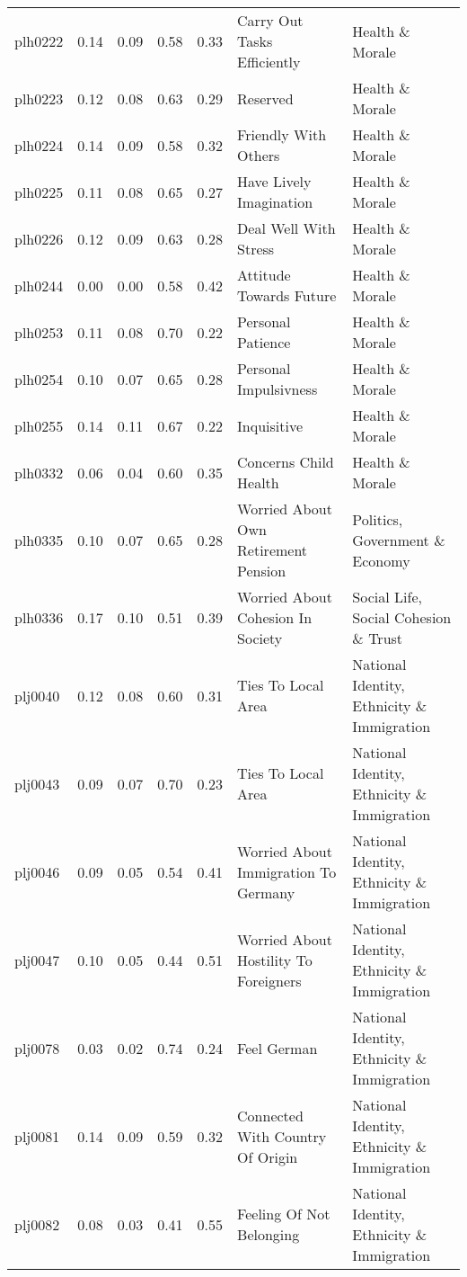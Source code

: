 \begin{longtable}{l|rrrrll}
plh0222 & 0.14 & 0.09 & 0.58 & 0.33 & Carry Out Tasks Efficiently & Health \& Morale \\ 
plh0223 & 0.12 & 0.08 & 0.63 & 0.29 & Reserved & Health \& Morale \\ 
plh0224 & 0.14 & 0.09 & 0.58 & 0.32 & Friendly With Others & Health \& Morale \\ 
plh0225 & 0.11 & 0.08 & 0.65 & 0.27 & Have Lively Imagination & Health \& Morale \\ 
plh0226 & 0.12 & 0.09 & 0.63 & 0.28 & Deal Well With Stress & Health \& Morale \\ 
plh0244 & 0.00 & 0.00 & 0.58 & 0.42 & Attitude Towards Future & Health \& Morale \\ 
plh0253 & 0.11 & 0.08 & 0.70 & 0.22 & Personal Patience & Health \& Morale \\ 
plh0254 & 0.10 & 0.07 & 0.65 & 0.28 & Personal Impulsivness & Health \& Morale \\ 
plh0255 & 0.14 & 0.11 & 0.67 & 0.22 & Inquisitive & Health \& Morale \\ 
plh0332 & 0.06 & 0.04 & 0.60 & 0.35 & Concerns Child Health & Health \& Morale \\ 
plh0335 & 0.10 & 0.07 & 0.65 & 0.28 & Worried About Own Retirement Pension & Politics, Government \& Economy \\ 
plh0336 & 0.17 & 0.10 & 0.51 & 0.39 & Worried About Cohesion In Society & Social Life, Social Cohesion \& Trust \\ 
plj0040 & 0.12 & 0.08 & 0.60 & 0.31 & Ties To Local Area & National Identity, Ethnicity \& Immigration \\ 
plj0043 & 0.09 & 0.07 & 0.70 & 0.23 & Ties To Local Area & National Identity, Ethnicity \& Immigration \\ 
plj0046 & 0.09 & 0.05 & 0.54 & 0.41 & Worried About Immigration To Germany & National Identity, Ethnicity \& Immigration \\ 
plj0047 & 0.10 & 0.05 & 0.44 & 0.51 & Worried About Hostility To Foreigners & National Identity, Ethnicity \& Immigration \\ 
plj0078 & 0.03 & 0.02 & 0.74 & 0.24 & Feel German & National Identity, Ethnicity \& Immigration \\ 
plj0081 & 0.14 & 0.09 & 0.59 & 0.32 & Connected With Country Of Origin & National Identity, Ethnicity \& Immigration \\ 
plj0082 & 0.08 & 0.03 & 0.41 & 0.55 & Feeling Of Not Belonging & National Identity, Ethnicity \& Immigration \\ 

\end{longtable}
